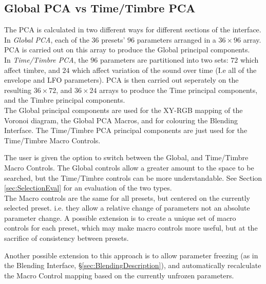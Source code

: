 \documentclass[11pt, oneside]{report}   	%
\begin{document}
\subsection{Global PCA vs Time/Timbre PCA}\label{sec:GlobalTimeTimbre}
The PCA is calculated in two different ways for different sections of the interface. In \emph{Global PCA}, each of the $36$ presets' $96$ parameters arranged in a $36 \times 96$ array. PCA is carried out on this array to produce the Global principal components. 
\\
In \emph{Time/Timbre PCA}, the $96$ parameters are partitioned into two sets: $72$ which affect timbre, and $24$ which affect variation of the sound over time (I.e all of the envelope and LFO parameters). PCA is then carried out seperately on the resulting  $36 \times 72$, and $36 \times 24$ arrays to produce the Time principal components, and the Timbre principal components. 
\\
The Global principal components are used for the XY-RGB mapping of the Voronoi diagram, the Global PCA Macros, and for colouring the Blending Interface. The Time/Timbre PCA principal components are just used for the Time/Timbre Macro Controls.

The user is given the option to switch between the Global, and Time/Timbre Macro Controls. The Global controls allow a greater amount to the space to be searched, but the Time/Timbre controls can be more understandable. See Section \ref{sec:SelectionEval} for an evaluation of the two  types.\\
The Macro controls are the same for all presets, but centered on the currently selected preset. i.e. they allow a relative change of parameters not an absolute parameter change. A possible extension is to create a unique set of macro controls for each preset, which may make macro controls more useful, but at the sacrifice of consistency between presets.

Another possible extension to this approach is to allow parameter freezing (as in the Blending Interface, \S \ref{sec:BlendingDescription}), and automatically recalculate the Macro Control mapping based on the currently unfrozen parameters.
\end{document}
